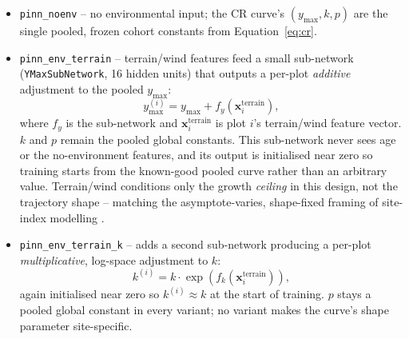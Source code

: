 \begin{itemize}
\setlength\itemsep{0pt}
\item \texttt{pinn\_noenv} -- no environmental input; the CR curve's $(y_{\max},k,p)$ are the
  single pooled, frozen cohort constants from Equation~\ref{eq:cr}.
\item \texttt{pinn\_env\_terrain} -- terrain/wind features feed a small sub-network
  (\texttt{YMaxSubNetwork}, 16 hidden units) that outputs a per-plot \emph{additive} adjustment to
  the pooled $y_{\max}$:
  \begin{equation}
  y_{\max}^{(i)} = y_{\max} + f_{y}\!\left(\mathbf{x}^{\text{terrain}}_i\right),
  \label{eq:ymax-adjust}
  \end{equation}
  where $f_y$ is the sub-network and $\mathbf{x}^{\text{terrain}}_i$ is plot $i$'s terrain/wind
  feature vector. $k$ and $p$ remain the pooled global constants. This sub-network never sees age
  or the no-environment features, and its output is initialised near zero so training starts from
  the known-good pooled curve rather than an arbitrary value. Terrain/wind conditions only the
  growth \emph{ceiling} in this design, not the trajectory shape -- matching the
  asymptote-varies, shape-fixed framing of site-index modelling
  \citep{socha2021}. %
\item \texttt{pinn\_env\_terrain\_k} -- adds a second sub-network producing a per-plot
  \emph{multiplicative}, log-space adjustment to $k$:
  \begin{equation}
  k^{(i)} = k \cdot \exp\!\left(f_{k}\!\left(\mathbf{x}^{\text{terrain}}_i\right)\right),
  \label{eq:k-adjust}
  \end{equation}
  again initialised near zero so $k^{(i)}\approx k$ at the start of training. $p$ stays a pooled
  global constant in every variant; no variant makes the curve's shape parameter site-specific.
\end{itemize}

